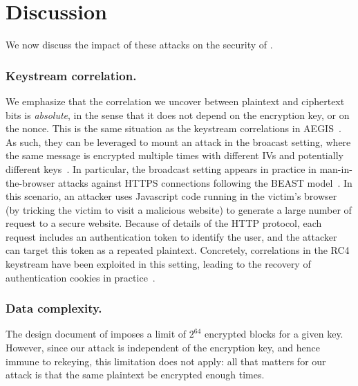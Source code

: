 

\section{Discussion}
\label{sec/Discussion}


We now discuss the impact of these attacks on the security of \MORUS.

\subsubsection{Keystream correlation.}

We emphasize that the correlation we uncover between plaintext and ciphertext bits is
\emph{absolute}, in the sense that it does not depend on the encryption
key, or on the nonce.  This is the same situation as the keystream correlations
in AEGIS~\cite{sacryptMinaud14}.  As such, they can be leveraged to
mount an attack in the broacast setting, where the same message is
encrypted multiple times with different IVs and potentially different
keys~\cite{DBLP:conf/fse/MantinS01}.  In particular, the broadcast setting appears
in practice in man-in-the-browser attacks against HTTPS connections
following the BEAST model~\cite{duong2011here}.  In this scenario, an
attacker uses Javascript code running in the victim's browser (by
tricking the victim to visit a malicious website) to generate a large
number of request to a secure website.  Because of details of the HTTP
protocol, each request includes an authentication token to identify the
user, and the attacker can target this token as a repeated plaintext.
Concretely, correlations in the RC4 keystream have been exploited in this
setting, leading to the recovery of authentication cookies in
practice~\cite{DBLP:conf/uss/AlFardanBPPS13}.

\subsubsection{Data complexity.}

The design document of  imposes a limit of $2^{64}$
encrypted blocks for a given key. However, since our attack is
independent of the encryption key, and hence immune to rekeying, this
limitation does not apply: all that matters for our attack is that the
same plaintext be encrypted enough times.

